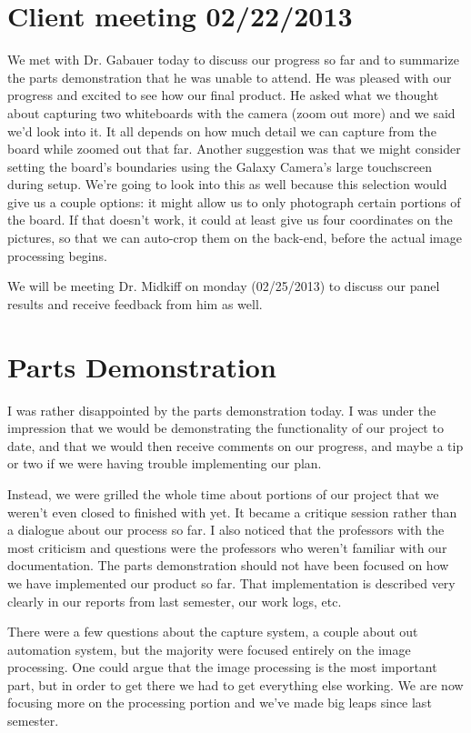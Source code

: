 \documentclass[]{article}
\begin{document}
	
	\section{Client meeting 02/22/2013}
	
	We met with Dr. Gabauer today to discuss our progress so far and to summarize the parts demonstration that he was unable to attend. He was pleased with our progress and excited to see how our final product. He asked what we thought about capturing two whiteboards with the camera (zoom out more) and we said we'd look into it. It all depends on how much detail we can capture from the board while zoomed out that far. Another suggestion was that we might consider setting the board's boundaries using the Galaxy Camera's large touchscreen during setup. We're going to look into this as well because this selection would give us a couple options: it might allow us to only photograph certain portions of the board. If that doesn't work, it could at least give us four coordinates on the pictures, so that we can auto-crop them on the back-end, before the actual image processing begins.
	
	We will be meeting Dr. Midkiff on monday (02/25/2013) to discuss our panel results and receive feedback from him as well.
	
	\section{Parts Demonstration}
	
	I was rather disappointed by the parts demonstration today. I was under the impression that we would be demonstrating the functionality of our project to date, and that we would then receive comments on our progress, and maybe a tip or two if we were having trouble implementing our plan.
	
	Instead, we were grilled the whole time about portions of our project that we weren't even closed to finished with yet. It became a critique session rather than a dialogue about our process so far. I also noticed that the professors with the most criticism and questions were the professors who weren't familiar with our documentation. The parts demonstration should not have been focused on how we have implemented our product so far. That implementation is described very clearly in our reports from last semester, our work logs, etc.	
	
	There were a few questions about the capture system, a couple about out automation system, but the majority were focused entirely on the image processing. One could argue that the image processing is the most important part, but in order to get there we had to get everything else working. We are now focusing more on the processing portion and we've made big leaps since last semester. 	
\end{document}
